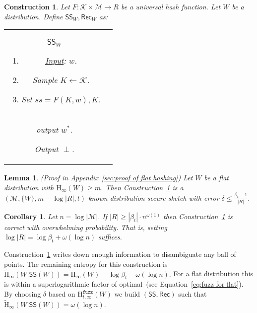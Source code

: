 \documentclass[11pt]{article}
\newcommand{\supp}{\operatorname{supp}}
\newcommand{\apref}[1]{\mbox{Appendix~\ref{#1}}}
\newcommand{\consref}[1]{\mbox{Construction~\ref{#1}}}
\newcommand{\class}[1]{{\ensuremath{\mathsf{#1}}}}
\newcommand{\sketch}{\ensuremath{\class{SS}}\xspace}
\newcommand{\rec}{\ensuremath{\class{Rec}}\xspace}
\newcommand{\dis}{\ensuremath{\mathsf{dis}}}
\newcommand{\Hoo}{\mathrm{H}_\infty}
\newcommand{\Hav}{\tilde{\mathrm{H}}_\infty}
\newcommand{\Hfuzz}{\mathrm{H}^{\mathtt{fuzz}}_{t,\infty}}
\newtheorem{lemma}[theorem]{Lemma}
\newtheorem{corollary}[theorem]{Corollary}
\newtheorem{construction}[theorem]{Construction}
\begin{document}
\begin{construction}
\label{cons:universal hash}
Let $F :\mathcal{K}\times \mathcal{M}\rightarrow R$ be a universal hash function.  Let $W$ be a distribution.  Define $\sketch_W, \rec_W$ as:

\begin{center}
\begin{tabular}{c|c}
\begin{minipage}{2.5in}
\textbf{$\sketch_W$}
\begin{enumerate}
\item \underline{Input}: $w$.
\item Sample $K\leftarrow \mathcal{K}$.
\item Set $ss = F(K, w), K$.
\end{enumerate}
\vspace{.3in}
\end{minipage} &
\begin{minipage}{3.5in}
\textbf{$\rec_W$}
\begin{enumerate}
\item \underline{Input}: $(w', ss =( y, K))$
\item Let $W^* = \{w \in \supp(W) | \dis(w, w')\le t\}$.
\item For $w^*\in W^*$, if $F(K, w^*) = y$, \\ output $w^*$.
\item Output $\perp$.
\end{enumerate}
\end{minipage}
\end{tabular}
\end{center}
\end{construction}

\begin{lemma}
\label{lem:flat hashing} (Proof in \apref{sec:proof of flat hashing})
Let $W$ be a flat distribution with $\Hoo(W)\ge m$.  Then
\consref{cons:universal hash} is a $(\mathcal{M}, \{W\}, m - \log |R|, t)$-known distribution secure sketch with error $\delta \le \frac{\beta_{t}-1}{|R|}$. 
\end{lemma}
\begin{corollary}
Let $n = \log |\mathcal{M}|$.  If $|R| \ge |\beta_{t}|\cdot n^{\omega(1)}$ then \consref{cons:universal hash} is correct with overwhelming probability.  That is, setting $\log |R| = \log \beta_{t} + \omega(\log n)$ suffices.
\end{corollary}

\noindent
\consref{cons:universal hash} writes down enough information to disambiguate any ball of points.  The remaining entropy for this construction is 
$
\Hav(W |\sketch(W)) = \Hoo(W) - \log \beta_{t} - \omega(\log n).
$
For a flat distribution this is within a superlogarithmic factor of optimal~(see Equation~\eqref{eq:fuzz for flat}). By choosing $\delta$ based on $\Hfuzz(W)$ we build $(\sketch, \rec)$ such that $\Hav(W | \sketch(W)) = \omega(\log n)$.
\end{document}
